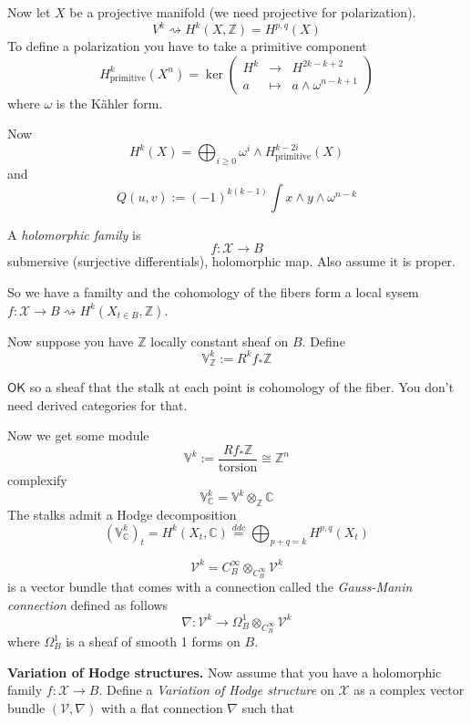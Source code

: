 Now let $X$ be a projective manifold (we need
projective for polarization).
$$
V^k\rightsquigarrow
H^{k}(X,\mathbb{Z})=H^{p,q}(X)
$$
To define a polarization you have to take a
primitive component
$$
H^k_{\operatorname{primitive}}(X^n)=\ker
\left(
\begin{array}{rcl}
H^k & \longrightarrow & H^{2k-k+2} \\
a & \longmapsto & a\wedge \omega^{n-k+1}
\end{array} \right)
$$
where $\omega$ is the Kähler form.

Now
$$
H^{k}(X)=\bigoplus_{i\geq 0} \omega^i\wedge
H^{k-2i}_{\operatorname{primitive}}(X)
$$
and
$$
Q(u,v):=(-1)^{k(k-1)} \int x\wedge y\wedge
\omega^{n-k}
$$

\begin{definition}
\label{definition-tw-holomorphic-family}
A {\it holomorphic family} is
$$
f:\mathcal{X}\to B
$$
submersive (surjective differentials),
holomorphic map. Also assume it is proper.
\end{definition}

So we have a familty and the cohomology of
the fibers form a local sysem
$f:\mathcal{X}\to B\rightsquigarrow
H^{k}(X_{t\in B},\mathbb{Z})$.

Now suppose you have $\mathbb{Z}$ locally
constant sheaf on $B$. Define
$$
\mathbb{V}^k_\mathbb{Z}:=R^kf_*\mathbb{Z}
$$

$\mathsf{OK}$ so a sheaf that the stalk at
each point is cohomology of the fiber. You
don't need derived categories for that.

Now we get some module
$$
\mathbb{V}^k:=\frac{Rf_*
\mathbb{Z}}{\text{torsion} }\cong
\mathbb{Z}^n
$$
complexify
$$
\mathbb{V}^k_{\mathbb{C}}=\mathbb{V}^k
\otimes_{\mathbb{Z}}\mathbb{C}
$$
The stalks admit a Hodge decomposition
$$
(\mathbb{V}^k_{\mathbb{C}})_t=H^{k}(X_t,
\mathbb{C})\overset{ddc}{=}\bigoplus_{p+q=k}
H^{p,q}(X_t)
$$

\begin{definition}
\label{definition-tw-gauss-manin}
$$
\mathcal{V}^k=C_B^\infty\otimes_{C^\infty_B}
\mathcal{V}^k
$$
is a vector bundle that comes with a
connection called the {\it Gauss-Manin
connection} defined as follows
$$
\nabla :\mathcal{V}^k\to \Omega^{1}_B
\otimes_{C^\infty_B}\mathcal{V}^k
$$
where $\Omega^1_B$ is a sheaf of smooth 1
forms on $B$.
\end{definition}

\medskip\noindent
{\bf Variation of Hodge structures.}
Now assume that you have a holomorphic family
$f:\mathcal{X}\to B$. Define a {\it Variation
of Hodge structure} on $\mathcal{X}$ as a
complex vector bundle $(\mathcal{V},\nabla )$
with a flat connection $\nabla$ such that

